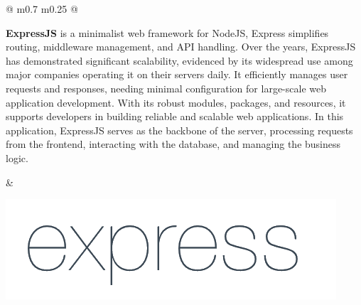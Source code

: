	\begin{tabular}{ @{} m{0.7\textwidth} m{0.25\textwidth} @{} }
		\begin{minipage}{\linewidth}
			\textbf{ExpressJS} is a minimalist web framework for NodeJS, Express simplifies routing, middleware management, and API handling. Over the years, ExpressJS has demonstrated significant scalability, evidenced by its widespread use among major companies operating it on their servers daily. It efficiently manages user requests and responses, needing minimal configuration for large-scale web application development. With its robust modules, packages, and resources, it supports developers in building reliable and scalable web applications.\cite{express-what-is} In this application, ExpressJS serves as the backbone of the server, processing requests from the frontend, interacting with the database, and managing the business logic.
		\end{minipage}
		&
		\begin{minipage}{\linewidth}
			\centering
			\includegraphics[width=0.8\linewidth]{graphics/expressjs.png}
			\label{fig:expressjs}
			
		\end{minipage}
	\end{tabular}
	
